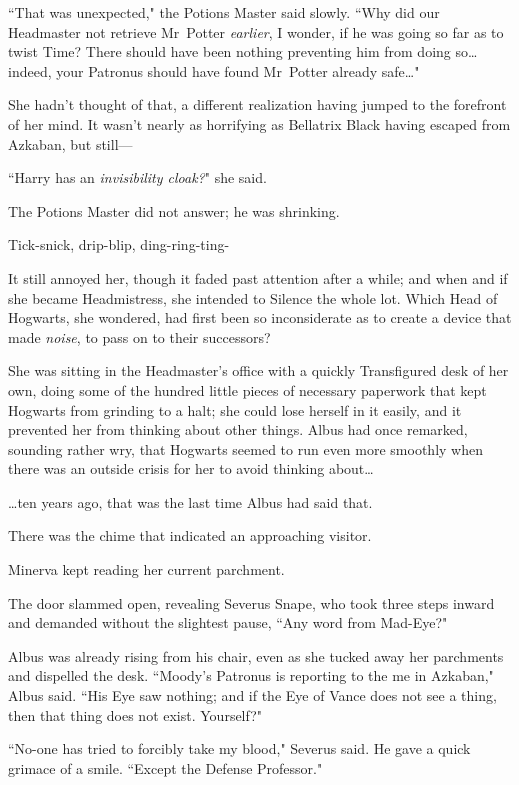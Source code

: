 ``That was unexpected," the Potions Master said slowly. ``Why did our Headmaster not retrieve Mr~Potter \emph{earlier}, I wonder, if he was going so far as to twist Time? There should have been nothing preventing him from doing so{\ldots} indeed, your Patronus should have found Mr~Potter already safe{\ldots}"

She hadn't thought of that, a different realization having jumped to the forefront of her mind. It wasn't nearly as horrifying as Bellatrix Black having escaped from Azkaban, but still—

``Harry has an \emph{invisibility cloak?}" she said.

The Potions Master did not answer; he was shrinking.

\later

Tick-snick, drip-blip, ding-ring-ting-

It still annoyed her, though it faded past attention after a while; and when and if she became Headmistress, she intended to Silence the whole lot. Which Head of Hogwarts, she wondered, had first been so inconsiderate as to create a device that made \emph{noise}, to pass on to their successors?

She was sitting in the Headmaster's office with a quickly Transfigured desk of her own, doing some of the hundred little pieces of necessary paperwork that kept Hogwarts from grinding to a halt; she could lose herself in it easily, and it prevented her from thinking about other things. Albus had once remarked, sounding rather wry, that Hogwarts seemed to run even more smoothly when there was an outside crisis for her to avoid thinking about{\ldots}

{\ldots}ten years ago, that was the last time Albus had said that.

There was the chime that indicated an approaching visitor.

Minerva kept reading her current parchment.

The door slammed open, revealing Severus Snape, who took three steps inward and demanded without the slightest pause, ``Any word from Mad-Eye?"

Albus was already rising from his chair, even as she tucked away her parchments and dispelled the desk. ``Moody's Patronus is reporting to the me in Azkaban," Albus said. ``His Eye saw nothing; and if the Eye of Vance does not see a thing, then that thing does not exist. Yourself?"

``No-one has tried to forcibly take my blood," Severus said. He gave a quick grimace of a smile. ``Except the Defense Professor."


